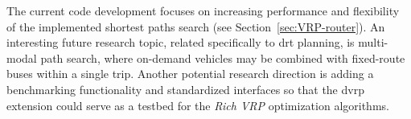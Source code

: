 The current code development focuses on increasing performance and flexibility of the implemented shortest paths search (see Section~\ref{sec:VRP-router}). An interesting future research topic, related specifically to \gls{drt} planning, is multi-modal path search, where on-demand vehicles may be combined with fixed-route buses within a single trip. Another potential research direction is adding a benchmarking functionality and standardized interfaces so that the \gls{dvrp} extension could serve as a testbed for the \emph{Rich VRP} optimization algorithms.

